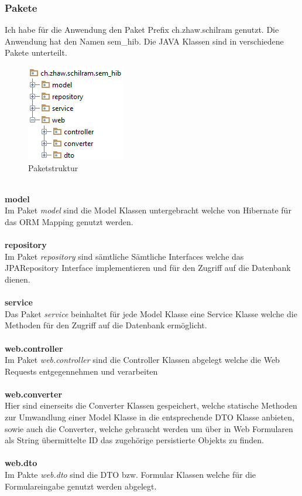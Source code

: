 \subsubsection{Pakete}
Ich habe für die Anwendung den Paket Prefix ch.zhaw.schilram genutzt. Die Anwendung hat den Namen sem\_hib. Die JAVA Klassen sind in verschiedene Pakete unterteilt.
\begin{figure}[h]
\centering
\includegraphics[width=0.2\columnwidth]{graphics/pakete.png}%
	\caption{Paketstruktur}
	\label{fig:Paketstruktur}
\end{figure}
\\
\textbf{model}\\
Im Paket \emph{model} sind die Model Klassen untergebracht welche von Hibernate für das ORM Mapping genutzt werden.\\\\
\textbf{repository}\\
Im Paket \emph{repository} sind sämtliche Sämtliche Interfaces welche das JPARepository Interface implementieren und für den Zugriff auf die Datenbank dienen.\\\\
\textbf{service}\\
Das Paket \emph{service} beinhaltet für jede Model Klasse eine Service Klasse welche die Methoden für den Zugriff auf die Datenbank ermöglicht.\\\\
\textbf{web.controller}\\
Im Paket \emph{web.controller} sind die Controller Klassen abgelegt welche die Web Requests entgegennehmen und verarbeiten\\\\
\textbf{web.converter}\\
Hier sind einerseits die Converter Klassen gespeichert, welche statische Methoden zur Umwandlung einer Model Klasse in die entsprechende DTO Klasse anbieten, sowie auch die Converter, welche gebraucht werden um über in Web Formularen als String übermittelte ID das zugehörige persistierte Objekts zu finden.\\\\
\textbf{web.dto}\\
Im Pakte \emph{web.dto} sind die DTO bzw. Formular Klassen welche für die Formulareingabe genutzt werden abgelegt.

